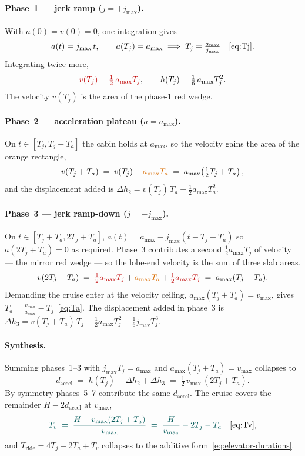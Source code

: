 \documentclass[manuscript,review,screen]{acmart}
\begin{document}
\paragraph{Phase~1 --- jerk ramp ($j=+j_{\max}$).}
With $a(0)\!=\!v(0)\!=\!0$, one integration gives
\[
  a(t) = j_{\max}\,t,
  \qquad
  a(T_j)=a_{\max}\;\Longrightarrow\;
  T_j=\tfrac{a_{\max}}{j_{\max}}\quad\eqref{eq:Tj}.
\]
Integrating twice more,
\[
  \textcolor{red!75!black}{v(T_j)=\tfrac12\,a_{\max}T_j},
  \qquad
  h(T_j)=\tfrac16\,a_{\max}T_j^{2}.
\]
The velocity $v(T_j)$ is the area of the phase-1 red wedge.

\paragraph{Phase~2 --- acceleration plateau ($a=a_{\max}$).}
On $t\in[T_j,T_j+T_a]$ the cabin holds at $a_{\max}$, so the
velocity gains the area of the orange rectangle,
\[
  v(T_j+T_a) \;=\; v(T_j)+\textcolor{orange!85!black}{a_{\max}T_a}
             \;=\; a_{\max}\!\left(\tfrac12 T_j+T_a\right),
\]
and the displacement added is
$\Delta h_{2} = v(T_j)\,T_a+\tfrac12 a_{\max}T_a^{2}$.

\paragraph{Phase~3 --- jerk ramp-down ($j=-j_{\max}$).}
On $t\in[T_j+T_a,2T_j+T_a]$, $a(t)=a_{\max}-j_{\max}(t-T_j-T_a)$ so
$a(2T_j+T_a)\!=\!0$ as required.  Phase~3 contributes a second
$\tfrac12 a_{\max}T_j$ of velocity --- the mirror red wedge --- so
the lobe-end velocity is the sum of three slab areas,
\[
  v(2T_j+T_a)
  \;=\; \textcolor{red!75!black}{\tfrac12 a_{\max}T_j}
       +\textcolor{orange!85!black}{a_{\max}T_a}
       +\textcolor{red!75!black}{\tfrac12 a_{\max}T_j}
  \;=\; a_{\max}(T_j+T_a).
\]
Demanding the cruise enter at the velocity ceiling,
$a_{\max}(T_j+T_a)\!=\!v_{\max}$, gives
$T_a=\tfrac{v_{\max}}{a_{\max}}-T_j$~\eqref{eq:Ta}.  The
displacement added in phase~3 is
\(
  \Delta h_{3} = v(T_j+T_a)\,T_j+\tfrac12 a_{\max}T_j^{2}
                -\tfrac16 j_{\max}T_j^{3}.
\)

\paragraph{Synthesis.}
Summing phases~1--3 with $j_{\max}T_j\!=\!a_{\max}$ and
$a_{\max}(T_j+T_a)\!=\!v_{\max}$ collapses to
\[
  d_{\text{accel}}
  \;=\; h(T_j)+\Delta h_{2}+\Delta h_{3}
  \;=\; \tfrac12\,v_{\max}\,(2T_j+T_a).
\]
By symmetry phases~5--7 contribute the same $d_{\text{accel}}$.
The cruise covers the remainder $H-2d_{\text{accel}}$ at $v_{\max}$,
\[
  \textcolor{teal!70!black}{T_v
    \;=\; \frac{H-v_{\max}(2T_j+T_a)}{v_{\max}}
    \;=\; \frac{H}{v_{\max}}-2T_j-T_a}
  \quad\eqref{eq:Tv},
\]
and $T_{\text{ride}}\!=\!4T_j+2T_a+T_v$ collapses to the additive
form~\eqref{eq:elevator-durations}.
\end{document}
